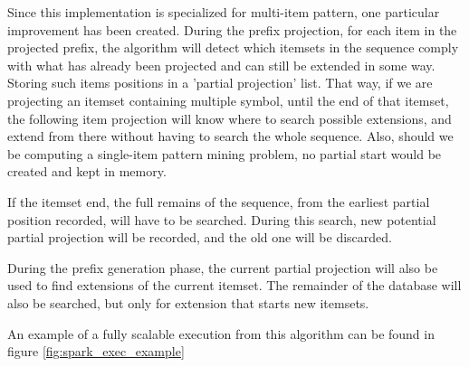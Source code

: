 \documentclass{eplmastersthesis}
\begin{document}
Since this implementation is specialized for multi-item pattern, one particular improvement has been created. During the prefix projection, for each item in the projected prefix, the algorithm will detect which itemsets in the sequence comply with what has already been projected and can still be extended in some way. Storing such items positions in a 'partial projection' list. \newline
That way, if we are projecting an itemset containing multiple symbol, until the end of that itemset, the following item projection will know where to search possible extensions, and extend from there without having to search the whole sequence. \newline
Also, should we be computing a single-item pattern mining problem, no partial start would be created and kept in memory. \newline

If the itemset end, the full remains of the sequence, from the earliest partial position recorded, will have to be searched. During this search, new potential partial projection will be recorded, and the old one will be discarded. \newline

During the prefix generation phase, the current partial projection will also be used to find extensions of the current itemset. The remainder of the database will also be searched, but only for extension that starts new itemsets. \newline

An example of a fully scalable execution from this algorithm can be found in figure \ref{fig:spark_exec_example} \newline
\end{document}
